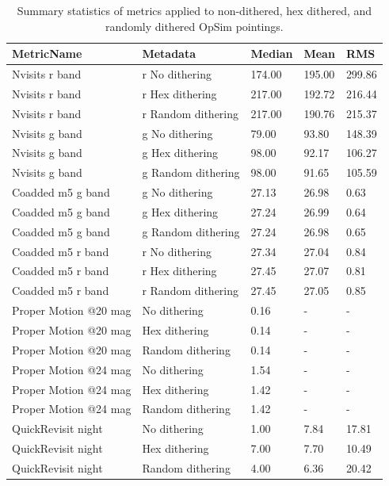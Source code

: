 \documentclass[]{spie}  %
\begin{document}
\begin{table}[]
\caption{Summary statistics of metrics applied to non-dithered,
  hex dithered, and randomly dithered OpSim pointings.}
\label{tab:summarystats}
\begin{center}
\begin{tabular}{|l|l|l|l|l|}
\hline
MetricName &  Metadata &  Median &  Mean &  RMS \\
\hline  
Nvisits r band &  r No dithering & 174.00 & 195.00 & 299.86\\  
Nvisits r band &  r Hex dithering & 217.00 & 192.72 & 216.44\\  
Nvisits r band &  r Random dithering & 217.00 & 190.76 & 215.37\\ 
\hline  
Nvisits g band &  g No dithering & 79.00 & 93.80 & 148.39\\ 
Nvisits g band &  g Hex dithering & 98.00 & 92.17 & 106.27\\ 
Nvisits g band &  g Random dithering & 98.00 & 91.65 & 105.59\\ 
\hline  
Coadded m5 g band &  g No dithering & 27.13 & 26.98 & 0.63\\
Coadded m5 g band &  g Hex dithering & 27.24 & 26.99 & 0.64\\  
Coadded m5 g band &  g Random dithering & 27.24 & 26.98 & 0.65\\ 
\hline  
Coadded m5 r band &  r No dithering & 27.34 & 27.04 & 0.84\\  
Coadded m5 r band &  r Hex dithering & 27.45 & 27.07 & 0.81\\  
Coadded m5 r band &  r Random dithering & 27.45 & 27.05 & 0.85\\
\hline  
Proper Motion @20 mag &   No dithering & 0.16 & - & - \\ 
Proper Motion @20 mag &   Hex dithering & 0.14 & - &  - \\
Proper Motion @20 mag &   Random dithering & 0.14 & - & -\\ 
\hline  
Proper Motion @24 mag &   No dithering & 1.54 & -  & - \\
Proper Motion @24 mag &   Hex dithering & 1.42 & - & - \\
Proper Motion @24 mag &   Random dithering & 1.42 &-  & - \\
\hline  
QuickRevisit night &   No dithering & 1.00 & 7.84 & 17.81\\ 
QuickRevisit night &   Hex dithering & 7.00 & 7.70 & 10.49\\ 
QuickRevisit night &   Random dithering & 4.00 & 6.36 & 20.42\\ 
\hline 
\end{tabular}
\end{center}
\end{table}
\end{document}
